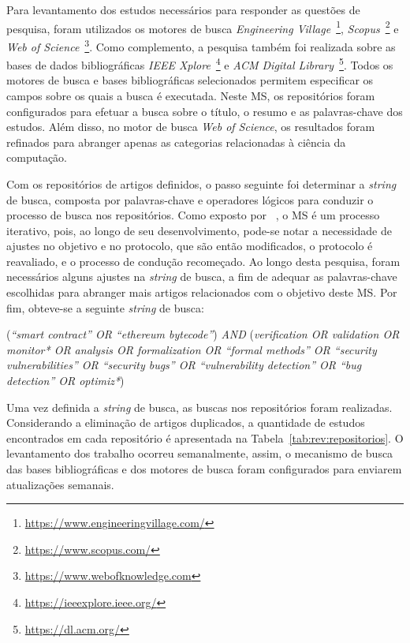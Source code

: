 Para levantamento dos estudos necessários para responder as questões de pesquisa, foram utilizados os motores de busca \textit{Engineering Village}~\footnote{\url{https://www.engineeringvillage.com/}}, \textit{Scopus}~\footnote{\url{https://www.scopus.com/}} e \textit{Web of Science}~\footnote{\url{https://www.webofknowledge.com}}. Como complemento, a pesquisa também foi realizada sobre as bases de dados bibliográficas \textit{IEEE Xplore}~\footnote{\url{https://ieeexplore.ieee.org/}} e \textit{ACM Digital Library}~\footnote{\url{https://dl.acm.org/}}. Todos os motores de busca e bases bibliográficas selecionados permitem especificar os campos sobre os quais a busca é executada. Neste MS, os repositórios foram configurados para efetuar a busca sobre o título, o resumo e as palavras-chave dos estudos. Além disso, no motor de busca \textit{Web of Science}, os resultados foram refinados para abranger apenas as categorias relacionadas à ciência da computação.

Com os repositórios de artigos definidos, o passo seguinte foi determinar a \textit{string} de busca, composta por palavras-chave e operadores lógicos para conduzir o processo de busca nos repositórios. Como exposto por ~, o MS é um processo iterativo, pois, ao longo de seu desenvolvimento, pode-se notar a necessidade de ajustes no objetivo e no protocolo, que são então modificados, o protocolo é reavaliado, e o processo de condução recomeçado. Ao longo desta pesquisa, foram necessários alguns ajustes na \textit{string} de busca, a fim de adequar as palavras-chave escolhidas para abranger mais artigos relacionados com o objetivo deste MS. Por fim, obteve-se a seguinte \textit{string} de busca:

\begin{center}
    (\textit{``smart contract'' OR ``ethereum bytecode''}) \textit{AND} (\textit{verification OR validation OR monitor* OR analysis OR formalization OR ``formal methods'' OR ``security vulnerabilities'' OR ``security bugs'' OR ``vulnerability detection'' OR ``bug detection'' OR optimiz*})
\end{center}



Uma vez definida a \textit{string} de busca, as buscas nos repositórios foram realizadas. Considerando a eliminação de artigos duplicados, a quantidade de estudos encontrados em cada repositório é apresentada na Tabela~\ref{tab:rev:repositorios}. O levantamento dos trabalho ocorreu semanalmente, assim, o mecanismo de busca das bases bibliográficas e dos motores de busca foram configurados para enviarem atualizações semanais.

